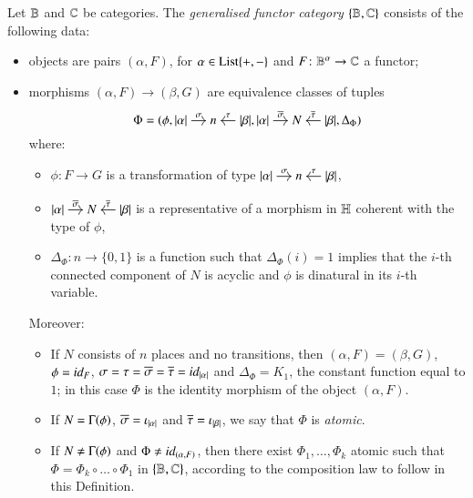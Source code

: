 \begin{definition}\label{def: generalised functor category}
    Let $\mathbb B$ and $\mathbb C$ be categories. The \emph{generalised functor category} $\{ \mathbb B,\mathbb C\}$ consists of the following data:
    \begin{itemize}[leftmargin=*]
        \item objects are pairs $(\alpha,F)$, for $\alpha \in \mathrm{List}\{+,-\}$ and $F \colon \mathbb B^\alpha \to \mathbb C$ a functor;
    \item morphisms $(\alpha,F) \to (\beta,G)$ are equivalence classes of tuples
    \[
    \Phi = (\phi,
    \begin{tikzcd}[cramped,sep=small]
    \length\alpha \ar[r,"\sigma"] & n & \length\beta \ar[l,"\tau"']
    \end{tikzcd},
    \begin{tikzcd}[cramped,sep=small]
    \length\alpha \ar[r,"\overline\sigma"] & N & \length\beta \ar[l,"\overline\tau"']
    \end{tikzcd},
    \Delta_\Phi
    )
    \]
    where:
            \begin{itemize}[leftmargin=*]
                \item $\phi \colon F \to G$ is a transformation of type
                $
                \begin{tikzcd}[cramped,sep=small]
                \length\alpha \ar[r,"\sigma"] & n & \length\beta \ar[l,"\tau"']
                \end{tikzcd}
                $,
                \item $
                \begin{tikzcd}[cramped,sep=small]
                    \length\alpha \ar[r,"\overline\sigma"] & N & \length\beta \ar[l,"\overline\tau"']
                \end{tikzcd}
            $ is a representative of a morphism in $\mathbb H$ coherent with the type of $\phi$,
            \item $\Delta_\Phi \colon n \to \{0,1\}$ is a function such that $\Delta_\Phi (i) = 1$ implies that the $i$-th connected component of $N$ is acyclic and $\phi$ is dinatural in its $i$-th variable.

    \end{itemize}
    Moreover: %
    \begin{itemize}[leftmargin=*]
        \item If $N$ consists of $n$ places and no transitions, then $(\alpha,F) = (\beta,G)$, $\phi=\id F$, $\sigma=\tau=\overline\sigma=\overline\tau=\mathop{\textit{id}_{\lvert \alpha \rvert}}$ and $\Delta_\Phi = K_1$, the constant function equal to $1$; in this case $\Phi$ is the identity morphism of the object $(\alpha,F)$.
        \item If $N = \graph\phi$, $\overline\sigma = \iota_{\lvert \alpha \rvert}$ and $\overline\tau=\iota_{\lvert \beta \rvert}$, we say that $\Phi$ is \emph{atomic}.
        \item If $N \ne \graph\phi$ and $\Phi \ne \mathop{\textit{id}_{(\alpha,F)}}$, then there exist $\Phi_1, \dots, \Phi_k$ atomic such that $\Phi = \Phi_k \circ \dots \circ \Phi_1$ in $\{ \mathbb B,\mathbb C\}$, according to the composition law to follow in this Definition.
    \end{itemize}


\end{itemize}
\end{definition}
